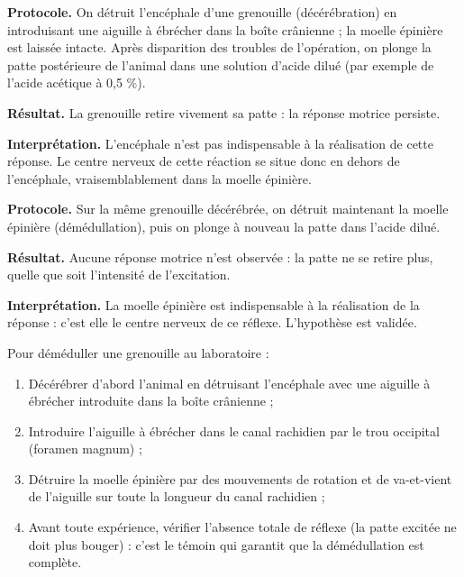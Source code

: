 \documentclass[11pt]{article}
\newcommand{\cle}[1]{{\popxbold\color{popdark}#1}}
\newcounter{popsec}
\newcounter{popsub}
\newcommand{\courssub}[1]{%
  \stepcounter{popsub}%
  \par\vspace{9pt}\noindent{\popxbold\fontsize{11.5}{13}\selectfont\color{popink}{\color{poporange}\thepopsec.\thepopsub}\hspace{6pt}#1}\par\nopagebreak\vspace{4pt}
}
\begin{document}
\courssub{Les expériences de Pflüger}

\begin{experience}
\textbf{Protocole.} On détruit l'encéphale d'une grenouille (décérébration) en introduisant une aiguille à ébrécher dans la boîte crânienne ; la moelle épinière est laissée intacte. Après disparition des troubles de l'opération, on plonge la patte postérieure de l'animal dans une solution d'acide dilué (par exemple de l'acide acétique à 0,5 \%).

\textbf{Résultat.} La grenouille retire vivement sa patte : la réponse motrice persiste.

\textbf{Interprétation.} L'encéphale n'est pas indispensable à la réalisation de cette réponse. Le centre nerveux de cette réaction se situe donc en dehors de l'encéphale, vraisemblablement dans la moelle épinière.
\end{experience}

\begin{experience}
\textbf{Protocole.} Sur la même grenouille décérébrée, on détruit maintenant la moelle épinière (démédullation), puis on plonge à nouveau la patte dans l'acide dilué.

\textbf{Résultat.} Aucune réponse motrice n'est observée : la patte ne se retire plus, quelle que soit l'intensité de l'excitation.

\textbf{Interprétation.} La moelle épinière est indispensable à la réalisation de la réponse : c'est elle le \cle{centre nerveux} de ce réflexe. L'hypothèse est validée.
\end{experience}

\begin{methode}
Pour déméduller une grenouille au laboratoire :
\begin{enumerate}
\item Décérébrer d'abord l'animal en détruisant l'encéphale avec une aiguille à ébrécher introduite dans la boîte crânienne ;
\item Introduire l'aiguille à ébrécher dans le canal rachidien par le trou occipital (foramen magnum) ;
\item Détruire la moelle épinière par des mouvements de rotation et de va-et-vient de l'aiguille sur toute la longueur du canal rachidien ;
\item Avant toute expérience, vérifier l'absence totale de réflexe (la patte excitée ne doit plus bouger) : c'est le témoin qui garantit que la démédullation est complète.
\end{enumerate}
\end{methode}
\end{document}
